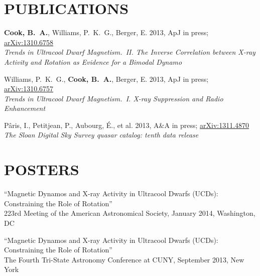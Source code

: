 \documentclass[margin]{res}
\begin{document}
\begin{resume}
\section{PUBLICATIONS}

\textbf{Cook, B.~A.}, Williams, P.~K.~G., Berger, E. 2013,
ApJ in press; \href{http://arxiv.org/abs/1310.6758}{arXiv:1310.6758}\\ \textit{Trends in Ultracool
  Dwarf Magnetism.~II. The Inverse Correlation between X-ray Activity
  and Rotation as Evidence for a Bimodal Dynamo}

Williams, P.~K.~G., \textbf{Cook, B.~A.}, Berger, E. 2013,
ApJ in press; \href{http://arxiv.org/abs/1310.6757}{arXiv:1310.6757}\\ \textit{Trends in Ultracool
  Dwarf Magnetism.~I. X-ray Suppression and Radio Enhancement}

P\^{a}ris, I., Petitjean, P., Aubourg, \'E., et al. 2013, A\&A in
press; \href{http://arxiv.org/abs/1311.4870}{arXiv:1311.4870}\\ \textit{The Sloan Digital Sky Survey quasar catalog: tenth
  data release}

\section{POSTERS}

``Magnetic Dynamos and X-ray Activity in Ultracool Dwarfs (UCDs):
Constraining the Role of Rotation''\\ 223rd Meeting of the American
Astronomical Society, January 2014, Washington, DC

``Magnetic Dynamos and X-ray Activity in Ultracool Dwarfs (UCDs):
Constraining the Role of Rotation''\\ The Fourth Tri-State Astronomy
Conference at CUNY, September 2013, New York


\end{resume}
\end{document}
